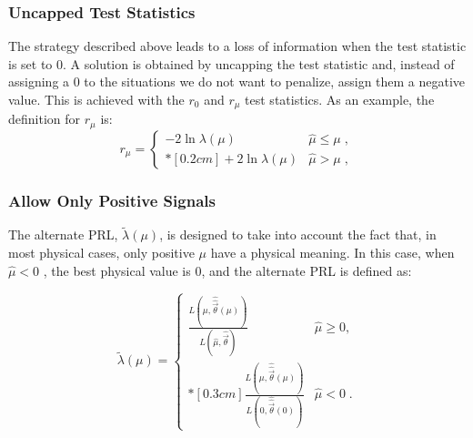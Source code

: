 
\subsubsection*{Uncapped Test Statistics}

The strategy described above leads to a loss of information when the test statistic is set to 0. A solution is obtained by uncapping the test statistic and, instead of assigning a 0 to the situations we do not want to penalize, assign them a negative value. This is achieved with the $r_0$ and $r_\mu$ test statistics. As an example, the definition for $r_\mu$ is:
\begin{equation}
\label{eq:rmu}
r_{\mu} =
\left\{ \! \! \begin{array}{ll}
               - 2 \ln \lambda(\mu)  & \hat{\mu} \le \mu  \;, \\*[0.2 cm]
               + 2 \ln \lambda(\mu)  & \hat{\mu} > \mu  \;,
              \end{array}
       \right.
\end{equation}

 
\subsubsection*{Allow Only Positive Signals}

The alternate PRL, $\tilde{\lambda}({\mu})$, is designed to take into account the fact that, in most physical cases, only positive $\mu$ have a physical meaning. In this case, when $\hat{\mu} < 0$ , the best physical value is 0, and the alternate PRL is defined as: 

\begin{equation}
\label{eq:stat:lik:alpexcl}
\tilde{\lambda}({\mu}) =
\left\{ \! \! \begin{array}{ll}
               \frac{ L(\mu,
               \hat{\hat{\vec{\theta}}}(\mu)) }
               {L(\hat{\mu}, \hat{\vec{\theta}}) }
                 & \hat{\mu} \ge 0 , \\*[0.3 cm]
                \frac{ L(\mu,
               \hat{\hat{\vec{\theta}}}(\mu)) }
               {L(0, \hat{\hat{\vec{\theta}}}(0)) }
 & \hat{\mu} < 0 \;.
              \end{array}
       \right.
\end{equation}

